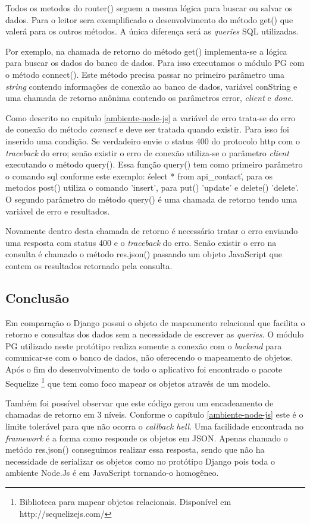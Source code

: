   Todos os metodos do router() seguem a mesma lógica para buscar ou salvar os dados. Para o leitor sera exemplificado o desenvolvimento
  do método get() que valerá para os outros métodos. A única diferença será as \textit{queries} \ac{SQL} utilizadas. 
  
  Por exemplo, na chamada de retorno do método get() implementa-se a lógica para buscar os dados do banco de dados. Para isso executamos 
  o módulo PG com o método connect(). Este método precisa passar no primeiro parâmetro uma \textit{string} contendo informações de conexão
  ao banco de dados, variável conString e uma chamada de retorno anônima contendo os parâmetros error, \textit{client} e \textit{done}.
  
  Como descrito no capitulo \ref{ambiente-node-js} a variável de erro trata-se do erro de conexão do método \textit{connect} e deve ser 
  tratada quando existir. Para isso foi inserido uma condição. Se verdadeiro envie o status 400 do protocolo http com o 
  \textit{traceback} do erro; senão existir o erro de conexão utiliza-se o parâmetro \textit{client} executando o método query(). Essa função query()
  tem como primeiro parâmetro o comando sql conforme este exemplo: \'select * from api\_contact\', para os metodos post() utiliza o comando
  'insert', para put() 'update' e delete() 'delete'. O segundo parâmetro do método query() é uma chamada de retorno tendo uma 
  variável de erro e resultados.
  
  Novamente dentro desta chamada de retorno é necessário tratar o erro enviando uma resposta com status 400 e o \textit{traceback} do erro.
  Senão existir o erro na consulta é chamado o método res.json() passando um objeto JavaScript que contem os resultados retornado
  pela consulta.

\subsection{Conclusão}

  Em comparação o Django possui o objeto de mapeamento relacional que facilita o retorno e consultas dos dados sem a necessidade
  de escrever as \textit{queries}. O módulo PG utilizado neste protótipo realiza somente a conexão com o \textit{backend} para comunicar-se com o 
  banco de dados, não oferecendo o mapeamento de objetos. Após o fim do desenvolvimento de todo o aplicativo foi encontrado o
  pacote Sequelize \footnote{Biblioteca para mapear objetos relacionais. Disponível em http://sequelizejs.com/} que tem como 
  foco mapear os objetos através de um modelo.
  
  Também foi possível observar que este código gerou um encadeamento de chamadas de retorno em 3 níveis. Conforme o capítulo \ref{ambiente-node-js}
  este é o limite tolerável para que não ocorra o \textit{callback hell}. Uma facilidade encontrada no \textit{framework} é a forma como responde
  os objetos em JSON. Apenas chamado o metódo res.json() conseguimos realizar essa resposta, sendo que não ha necessidade de serializar
  os objetos como no protótipo Django pois toda o ambiente Node.Js é em JavaScript tornando-o homogêneo.